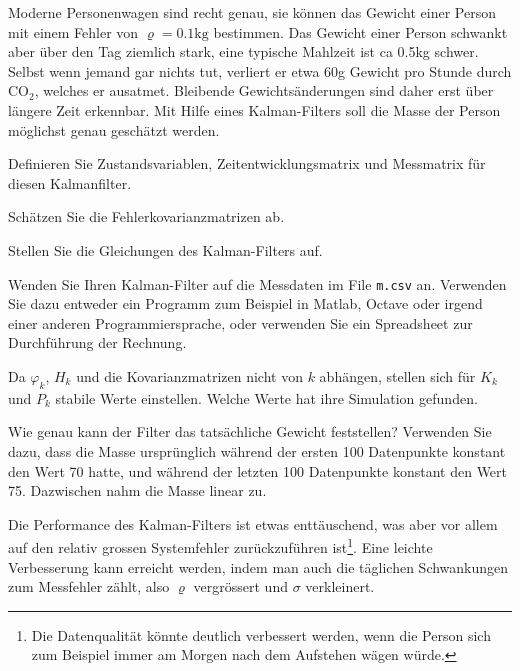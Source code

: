 Moderne Personenwagen sind recht genau, sie können das Gewicht einer
Person mit einem Fehler von $\varrho=0.1\text{kg}$ bestimmen.
Das Gewicht einer Person schwankt aber über den Tag ziemlich stark,
eine typische Mahlzeit ist ca 0.5kg schwer.
Selbst wenn jemand gar nichts tut, verliert er etwa 60g Gewicht pro
Stunde durch $\text{CO}_2$, welches er ausatmet.
Bleibende Gewichtsänderungen sind daher erst über längere Zeit erkennbar.
Mit Hilfe eines Kalman-Filters soll die Masse der Person möglichst genau
geschätzt werden.

\begin{teilaufgaben}
\item
Definieren Sie Zustandsvariablen, Zeitentwicklungsmatrix und Messmatrix
für diesen Kalmanfilter.
\item
Schätzen Sie die Fehlerkovarianzmatrizen ab.
\item 
Stellen Sie die Gleichungen des Kalman-Filters auf.
\item
Wenden Sie Ihren Kalman-Filter auf die Messdaten im File \texttt{m.csv} an.
Verwenden Sie dazu entweder ein Programm zum Beispiel in Matlab, Octave oder
irgend einer anderen Programmiersprache, oder verwenden Sie ein Spreadsheet
zur Durchführung der Rechnung.
\item
Da $\varphi_k$, $H_k$ und die Kovarianzmatrizen nicht von $k$ abhängen,
stellen sich für $K_k$ und $P_k$ stabile Werte einstellen.
Welche Werte hat ihre Simulation gefunden.
\item
Wie genau kann der Filter das tatsächliche Gewicht feststellen?
Verwenden Sie dazu, dass die Masse ursprünglich während der ersten
100 Datenpunkte konstant den Wert 70 hatte, und während der letzten
100 Datenpunkte konstant den Wert 75.
Dazwischen nahm die Masse linear zu.
\item
Die Performance des Kalman-Filters ist etwas enttäuschend, was aber
vor allem auf den relativ grossen Systemfehler zurückzuführen
ist\footnote{Die Datenqualität könnte deutlich verbessert werden, wenn
die Person sich zum Beispiel immer am Morgen nach dem Aufstehen wägen
würde.}.
Eine leichte Verbesserung kann erreicht werden, indem man auch die
täglichen Schwankungen zum Messfehler zählt, also $\varrho$ vergrössert
und $\sigma$ verkleinert. 
\end{teilaufgaben}

